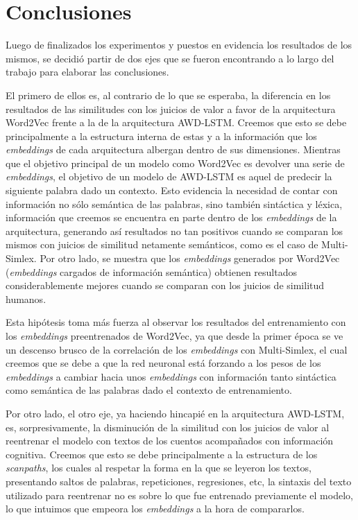 \chapter{Conclusiones}

Luego de finalizados los experimentos y puestos en evidencia los resultados de los mismos, 
se decidió partir de dos ejes que se fueron encontrando a lo largo del trabajo para 
elaborar las conclusiones.

El primero de ellos es, al contrario de lo que se esperaba, la diferencia en los 
resultados de las similitudes con los juicios de valor a favor de la arquitectura Word2Vec 
frente a la de la arquitectura AWD-LSTM. Creemos que esto se debe principalmente a la 
estructura interna de estas y a la información que los \textit{embeddings} de cada arquitectura 
albergan dentro de sus dimensiones. Mientras que el objetivo principal de un modelo 
como Word2Vec es devolver una serie de \textit{embeddings}, el objetivo de un modelo de AWD-LSTM 
es aquel de predecir la siguiente palabra dado un contexto. Esto evidencia la necesidad 
de contar con información no sólo semántica de las palabras, sino también sintáctica y 
léxica, información que creemos se encuentra en parte dentro de los \textit{embeddings} de la 
arquitectura, generando así resultados no tan positivos cuando se comparan los mismos 
con juicios de similitud netamente semánticos, como es el caso de Multi-Simlex. 
Por otro lado, se muestra que los \textit{embeddings} generados por Word2Vec 
(\textit{embeddings} cargados de información semántica) obtienen resultados 
considerablemente mejores cuando se comparan con los juicios de similitud humanos.

Esta hipótesis toma más fuerza al observar los resultados del entrenamiento 
con los \textit{embeddings} preentrenados de Word2Vec, ya que desde la primer época 
se ve un descenso brusco de la correlación de los \textit{embeddings} con Multi-Simlex, 
el cual creemos que se debe a que la red neuronal está forzando a los pesos 
de los \textit{embeddings} a cambiar hacia unos \textit{embeddings} con información tanto 
sintáctica como semántica de las palabras dado el contexto de entrenamiento.

Por otro lado, el otro eje, ya haciendo hincapié en la arquitectura AWD-LSTM, es, 
sorpresivamente, la disminución de la similitud con los juicios de valor al 
reentrenar el modelo con textos de los cuentos acompañados con información cognitiva. 
Creemos que esto se debe principalmente a la estructura de los \textit{scanpaths}, los 
cuales al respetar la forma en la que se leyeron los textos, presentando saltos 
de palabras, repeticiones, regresiones, etc, la sintaxis del texto utilizado 
para reentrenar no es sobre lo que fue entrenado previamente el modelo, lo 
que intuimos que empeora los \textit{embeddings} a la hora de compararlos.

